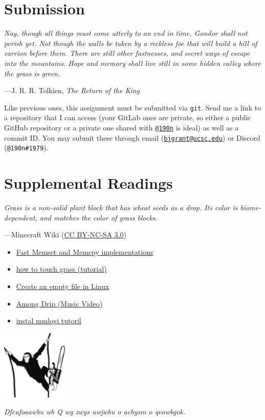 \documentclass[11pt]{article}
\begin{document}
\section{Submission}

\epigraph{\emph{Nay, though all things must come utterly to an end in time, Gondor shall not perish yet. Not though the walls be taken by a reckless foe that will build a hill of carrion before them. There are still other fastnesses, and secret ways of escape into the mountains. Hope and memory shall live still in some hidden valley where the grass is green.}}{---J. R. R. Tolkien, \emph{The Return of the King}}

\noindent
Like previous ones, this assignment must be submitted via \texttt{git}. Send me a link to a repository that I can access (your GitLab ones are private, so either a public GitHub repository or a private one shared with \href{https://github.com/190n}{\texttt{@190n}} is ideal) as well as a commit ID. You may submit these through email (\href{mailto:bjgrant@ucsc.edu?subject=Assignment\%208\%20submission}{\texttt{bjgrant@ucsc.edu}}) or Discord (\texttt{@190n\#1979}).

\section{Supplemental Readings}

\epigraph{\emph{Grass is a non-solid plant block that has wheat seeds as a drop. Its color is biome-dependent, and matches the color of grass blocks.}}{---Minecraft Wiki (\href{https://creativecommons.org/licenses/by-nc-sa/3.0/}{CC BY-NC-SA 3.0})}

\begin{itemize}
    \item \href{https://github.com/nadavrot/memset_benchmark}{Fast Memset and Memcpy implementations}
    \item \href{https://www.youtube.com/watch?v=Tix4hb2K3mY}{how to touch grass (tutorial)}
    \item \href{https://techwritersblog.com/linux/create_an_empty_file_in_linux/}{Create an empty file in Linux}
    \item \href{https://www.youtube.com/watch?v=xyOc32abDQ8}{Among Drip (Music Video)}
    \item \href{https://www.youtube.com/watch?v=cVF4rat_wFY}{instal mmlogi tutoril}
\end{itemize}

\begin{center}
\includegraphics[width=0.25\textwidth]{monke}

\emph{Dfcufoaawbu wb Q wg zwys uwjwbu o acbysm o qvowbgok.}
\end{center}
\end{document}
